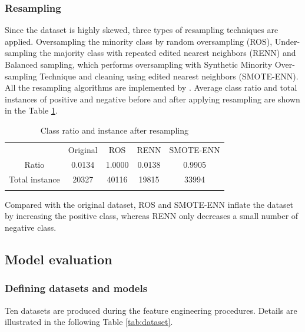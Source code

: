 \subsubsection{Resampling}
Since the dataset is highly skewed, three types of resampling techniques are applied. Oversampling the minority class by random oversampling (ROS), Under-sampling the majority class with repeated edited nearest neighbors\citep{Wilson} (RENN) and Balanced sampling, which performs oversampling with Synthetic Minority Over-sampling Technique and cleaning using edited nearest neighbors\citep{Batista} (SMOTE-ENN). All the resampling algorithms are implemented by \citep{Guillaume}. Average class ratio and total instances of positive and negative before and after applying resampling are shown in the Table \ref{tab:resampling}.

\begin{table}[h]
\caption{Class ratio and instance after resampling}
\label{tab:resampling}       %
\begin{tabular}{ccccc}
\hline\noalign{\smallskip}
 & Original & ROS & RENN & SMOTE-ENN \\
\noalign{\smallskip}\hline\noalign{\smallskip}
Ratio & 0.0134 & 1.0000 & 0.0138 & 0.9905 \\
Total instance & 20327 & 40116 & 19815 & 33994 \\
\noalign{\smallskip}\hline
\end{tabular}
\end{table}

Compared with the original dataset, ROS and SMOTE-ENN inflate the dataset by increasing the positive class, whereas RENN only decreases a small number of negative class.
\subsection{Model evaluation}
\subsubsection{Defining datasets and models}
Ten datasets are produced during the feature engineering procedures. Details are illustrated in the following Table \ref{tab:dataset}.

